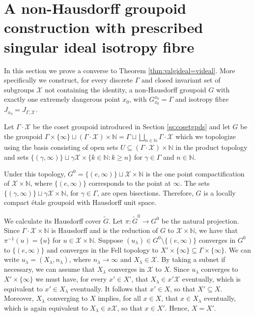 \documentclass[a4paper, 12pt]{amsart}
\theoremstyle{definition}
\theoremstyle{remark}
\numberwithin{equation}{section}
\begin{document}
\section{A non-Hausdorff groupoid construction with prescribed singular ideal isotropy fibre}
\label{s:nonHDconstruct}
In this section we prove a converse to Theorem \ref{thm:valgideal=videal}. More specifically we construct, for every discrete $\Gamma$ and closed invariant set of subgroups $\mathcal{X}$ not containing the identity, a non-Hausdorff groupoid $G$ with exactly one extremely dangerous point $x_{0}$, with $G^{x_{0}}_{x_{0}} = \Gamma$ and isotropy fibre $J_{x_{0}} = J_{\Gamma,\mathcal{X}}$.

Let $\Gamma\cdot\mathcal{X}$ be the coset groupoid introduced in Section \ref{ss:cosetgpds} and let $G$ be the groupoid $\Gamma\times\{\infty\}\sqcup (\Gamma\cdot \mathcal{X})\times \mathbb{N} = \Gamma\sqcup\bigsqcup_{n\in\mathbb{N}} \Gamma\cdot \mathcal{X} $ which we topologize using the basis consisting of open sets $U\subseteq (\Gamma\cdot\mathcal{X})\times \mathbb{N}$ in the product topology and sets $\{(\gamma,\infty)\}\sqcup \gamma\mathcal{X}\times \{k\in \mathbb{N}: k\geq n\}$ for $\gamma\in \Gamma$ and $n\in\mathbb{N}$.

Under this topology, $G^{0} = \{(e,\infty)\}\sqcup \mathcal{X}\times \mathbb{N}$ is the one point compactification of $\mathcal{X}\times \mathbb{N}$, where $\{(e,\infty)\}$ corresponds to the point at $\infty$. The sets $\{(\gamma,\infty)\}\sqcup \gamma\mathcal{X}\times \mathbb{N}$, for $\gamma\in \Gamma$, are open bisections. Therefore, $G$ is a locally compact \'etale groupoid with Hausdorff unit space. 

We calculate its Hausdorff cover $\tilde{G}$.
Let $\pi:\tilde{G}^{0}\to G^{0}$ be the natural projection. Since $\Gamma\cdot\mathcal{X}\times \mathbb{N}$ is Hausdorff and is the reduction of $G$ to $\mathcal{X}\times \mathbb{N}$, we have that $\pi^{-1}(u) = \{u\}$ for $u\in \mathcal{X}\times \mathbb{N}$. Suppose $(u_{\lambda})\in G^{0}\setminus \{(e,\infty)\}$ converges in $G^{0}$ to $\{(e,\infty)\}$ and converges in the Fell topology to $X'\times\{\infty\}\subseteq \Gamma\times\{\infty\}$. We can write $u_{\lambda} = (X_{\lambda}, n_{\lambda})$, where $n_{\lambda}\to \infty$ and $ X_{\lambda}\in \mathcal{X}$. By taking a subnet if necessary, we can assume that $X_{\lambda}$ converges in $\mathcal{X}$ to $X$. Since $u_{\lambda}$ converges to $X'\times\{\infty\}$ we must have, for every $x'\in X'$, that $X_{\lambda}\in x'\mathcal{X}$ eventually, which is equivalent to $x'\in X_{\lambda}$ eventually. It follows that $x'\in X$, so that $X'\subseteq X$. Moreover, $X_{\lambda}$ converging to $X$ implies, for all $x\in X$, that $x\in X_{\lambda}$ eventually, which is again equivalent to $X_{\lambda}\in x\mathcal{X}$, so that $x\in X'$. Hence, $X = X'$.
\end{document}
